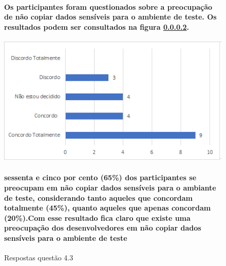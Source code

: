 \begin{figure}[!t]
\centering
\paragraph{Os participantes foram questionados sobre a preocupação de não copiar dados sensíveis para o ambiente de teste. Os resultados podem ser consultados na figura \ref{fig:4.3}.}

\includegraphics[scale=0.7]{figuras das questoes/4.3.png}
\caption{Respostas questão 4.3}
\paragraph{sessenta e cinco por cento (65{\%}) dos participantes se preocupam em não copiar dados sensíveis para o ambiante de teste, considerando tanto aqueles que concordam totalmente (45{\%}), quanto aqueles que apenas concordam (20{\%}).Com esse resultado fica claro que existe uma preocupação dos desenvolvedores em não copiar dados sensíveis para o ambiente de teste} 

\label{fig:4.3}
\end{figure}
